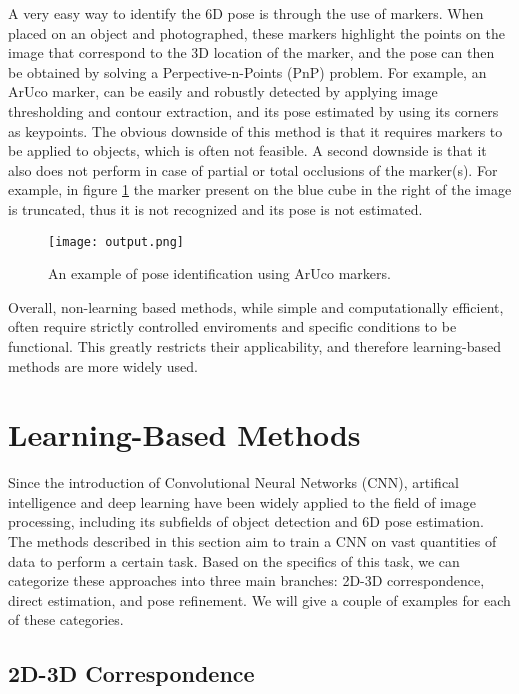 A very easy way to identify the 6D pose is through the use of markers. When placed on an object and photographed, these markers highlight the points on the image that correspond to the 3D location of the marker, and the pose can then be obtained by solving a Perpective-n-Points\cite{PnP} (PnP) problem. For example, an ArUco marker\cite{Aruco}, can be easily and robustly detected by applying image thresholding and contour extraction, and its pose estimated by using its corners as keypoints\cite{ArucoDetection}. The obvious downside of this method is that it requires markers to be applied to objects, which is often not feasible. A second downside is that it also does not perform in case of partial or total occlusions of the marker(s). For example, in figure \ref{fig:arucoExample} the marker present on the blue cube in the right of the image is truncated, thus it is not recognized and its pose is not estimated.

\begin{figure}[ht]
    \centering
    \texttt{[image: output.png]}
    \caption{An example of pose identification using ArUco markers.}
    \label{fig:arucoExample}
\end{figure}

Overall, non-learning based methods, while simple and computationally efficient, often require strictly controlled enviroments and specific conditions to be functional. This greatly restricts their applicability, and therefore learning-based methods are more widely used.

\section{Learning-Based Methods}
\label{s:learningbasedmethods}

Since the introduction of Convolutional Neural Networks (CNN), artifical intelligence and deep learning have been widely applied to the field of image processing, including its subfields of object detection and 6D pose estimation. The methods described in this section aim to train a CNN on vast quantities of data to perform a certain task. Based on the specifics of this task, we can categorize these approaches into three main branches: 2D-3D correspondence, direct estimation, and pose refinement. We will give a couple of examples for each of these categories.

\subsection{2D-3D Correspondence}
\label{ss:2D3D}

